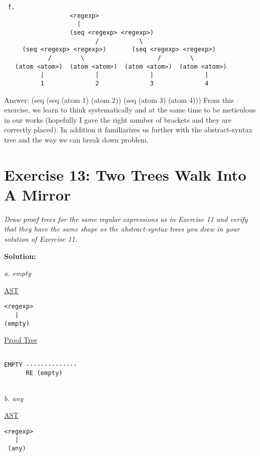 \documentclass{article}
\begin{document}
\begin{lstlisting}
 f.
                  <regexp>
                    |
                  (seq <regexp> <regexp>)
                         /           \
     (seq <regexp> <regexp>)       (seq <regexp> <regexp>)
            /        \                    /        \
   (atom <atom>)  (atom <atom>)  (atom <atom>)  (atom <atom>)
          |              |              |              |
          1              2              3              4
\end{lstlisting}
Answer: (seq (seq (atom 1) (atom 2)) (seq (atom 3) (atom 4))) 
\linebreak \linebreak
From this exercise, we learn to think systematically and at the same time to be meticulous in our works (hopefully I gave the right number of brackets and they are correctly placed). In addition it familiarizes us further with the abstract-syntax tree and the way we can break down problem.

\newpage
\newpage
\section{Exercise 13: Two Trees Walk Into A Mirror}

\textit{Draw proof trees for the same regular expressions as in Exercise 11 and verify that they have the same shape as the abstract-syntax trees you drew in your solution of Exercise 11.} \linebreak 

\noindent \textbf{Solution:}

\begin{quoting}
\textit{a. empty}
\end{quoting}

\underline{AST}
\begin{lstlisting}[language=vasu]
<regexp>
   |
(empty)

\end{lstlisting}

\underline{Proof Tree}
\begin{lstlisting}[language=vasu]

EMPTY --------------
      RE (empty)


\end{lstlisting}

\begin{quoting}
\textit{b. any}
\end{quoting}

\underline{AST}
\begin{lstlisting}[language=vasu]
<regexp>
   |
 (any)
\end{lstlisting}
\end{document}

